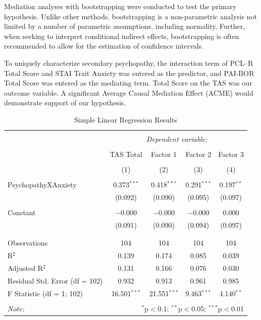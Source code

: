 \documentclass[
  man,floatsintext]{apa7}
\begin{document}
Mediation analyses with bootstrapping were conducted to test the primary hypothesis. Unlike other methods, bootstrapping is a non-parametric analysis not limited by a number of parametric assumptions, including normality. Further, when seeking to interpret conditional indirect effects, bootstrapping is often recommended to allow for the estimation of confidence intervals.

To uniquely characterize secondary psychopathy, the interaction term of PCL--R Total Score and STAI Trait Anxiety was entered as the predictor, and PAI-BOR Total Score was entered as the mediating term. Total Score on the TAS was our outcome variable. A significant Average Causal Mediation Effect (ACME) would demonstrate support of our hypothesis.

\begin{table}[!htbp] \centering 
  \caption{Simple Linear Regression Results} 
  \label{tab:simple-regression-output} 
\begin{tabular}{@{\extracolsep{1pt}}lcccc} 
\\[-1.8ex]\hline 
\hline \\[-1.8ex] 
 & \multicolumn{4}{c}{\textit{Dependent variable:}} \\ 
\cline{2-5} 
\\[-1.8ex] & TAS Total & Factor 1 & Factor 2 & Factor 3 \\ 
\\[-1.8ex] & (1) & (2) & (3) & (4)\\ 
\hline \\[-1.8ex] 
 PsychopathyXAnxiety & 0.373$^{***}$ & 0.418$^{***}$ & 0.291$^{***}$ & 0.197$^{**}$ \\ 
  & (0.092) & (0.090) & (0.095) & (0.097) \\ 
  & & & & \\ 
 Constant & $-$0.000 & $-$0.000 & $-$0.000 & 0.000 \\ 
  & (0.091) & (0.090) & (0.094) & (0.097) \\ 
  & & & & \\ 
\hline \\[-1.8ex] 
Observations & 104 & 104 & 104 & 104 \\ 
R$^{2}$ & 0.139 & 0.174 & 0.085 & 0.039 \\ 
Adjusted R$^{2}$ & 0.131 & 0.166 & 0.076 & 0.030 \\ 
Residual Std. Error (df = 102) & 0.932 & 0.913 & 0.961 & 0.985 \\ 
F Statistic (df = 1; 102) & 16.501$^{***}$ & 21.551$^{***}$ & 9.463$^{***}$ & 4.140$^{**}$ \\ 
\hline 
\hline \\[-1.8ex] 
\textit{Note:}  & \multicolumn{4}{r}{$^{*}$p$<$0.1; $^{**}$p$<$0.05; $^{***}$p$<$0.01} \\ 
\end{tabular} 
\end{table}
\end{document}
